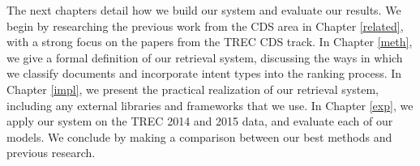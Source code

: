 The next chapters detail how we build our system and evaluate our results.
We begin by researching the previous work from the CDS area in Chapter \ref{related},
with a strong focus on the papers from the TREC CDS track.
In Chapter \ref{meth}, we give a formal definition of our retrieval system, discussing the ways in which we classify documents
and incorporate intent types into the ranking process.
In Chapter \ref{impl}, we present the practical realization of our retrieval system, including any external libraries
and frameworks that we use.
In Chapter \ref{exp}, we apply our system on the TREC 2014 and 2015 data, and evaluate each of our models.
We conclude by making a comparison between our best methods and previous research.







